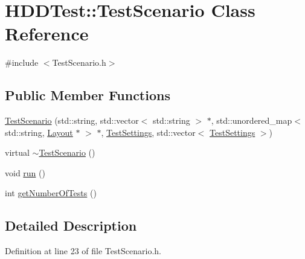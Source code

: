 \hypertarget{class_h_d_d_test_1_1_test_scenario}{\section{H\-D\-D\-Test\-:\-:Test\-Scenario Class Reference}
\label{class_h_d_d_test_1_1_test_scenario}
}


{\ttfamily \#include $<$Test\-Scenario.\-h$>$}

\subsection*{Public Member Functions}
\begin{DoxyCompactItemize}
\item 
\hyperlink{class_h_d_d_test_1_1_test_scenario_abbe9499202d1095c50140f570a2532dc}{Test\-Scenario} (std\-::string, std\-::vector$<$ std\-::string $>$ $\ast$, std\-::unordered\-\_\-map$<$ std\-::string, \hyperlink{class_h_d_d_test_1_1_layout}{Layout} $\ast$ $>$ $\ast$, \hyperlink{struct_h_d_d_test_1_1_test_settings}{Test\-Settings}, std\-::vector$<$ \hyperlink{struct_h_d_d_test_1_1_test_settings}{Test\-Settings} $>$)
\item 
virtual \hyperlink{class_h_d_d_test_1_1_test_scenario_a696957520e2865654b1a3fb862c386c0}{$\sim$\-Test\-Scenario} ()
\item 
void \hyperlink{class_h_d_d_test_1_1_test_scenario_a33ace13f97b5c5ded8da22ca55416c5a}{run} ()
\item 
int \hyperlink{class_h_d_d_test_1_1_test_scenario_afe92bd2a756f3f753f7cb8e8dd59eb53}{get\-Number\-Of\-Tests} ()
\end{DoxyCompactItemize}


\subsection{Detailed Description}


Definition at line 23 of file Test\-Scenario.\-h.



